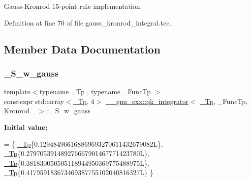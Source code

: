 Gauss-\/\+Kronrod 15-\/point rule implementation. 

Definition at line 70 of file gauss\+\_\+kronrod\+\_\+integral.\+tcc.



\subsection{Member Data Documentation}
\mbox{\label{struct____gnu__cxx_1_1qk__integrator_3_01__Tp_00_01__FuncTp_00_01Kronrod__15_01_4_aa127e01fbda9767c7602b5bf6db15bb4}} 
\subsubsection{\texorpdfstring{\+\_\+\+S\+\_\+w\+\_\+gauss}{\_S\_w\_gauss}}
{\footnotesize\ttfamily template$<$typename \+\_\+\+Tp , typename \+\_\+\+Func\+Tp $>$ \\
constexpr std\+::array$<$\hyperlink{namespace____gnu__cxx_a3b19a9c800ca194374ef9172290f7d79}{\+\_\+\+Tp}, 4$>$ \hyperlink{class____gnu__cxx_1_1qk__integrator}{\+\_\+\+\_\+gnu\+\_\+cxx\+::qk\+\_\+integrator}$<$ \hyperlink{namespace____gnu__cxx_a3b19a9c800ca194374ef9172290f7d79}{\+\_\+\+Tp}, \+\_\+\+Func\+Tp, Kronrod\+\_ $>$\+::\+\_\+\+S\+\_\+w\+\_\+gauss\hspace{0.3cm}{\ttfamily [static]}}

{\bfseries Initial value\+:}
\begin{DoxyCode}
=
      \{
        \hyperlink{namespace____gnu__cxx_a3b19a9c800ca194374ef9172290f7d79}{\_Tp}\{0.129484966168869693270611432679082L\},
        \hyperlink{namespace____gnu__cxx_a3b19a9c800ca194374ef9172290f7d79}{\_Tp}\{0.279705391489276667901467771423780L\},
        \hyperlink{namespace____gnu__cxx_a3b19a9c800ca194374ef9172290f7d79}{\_Tp}\{0.381830050505118944950369775488975L\},
        \hyperlink{namespace____gnu__cxx_a3b19a9c800ca194374ef9172290f7d79}{\_Tp}\{0.417959183673469387755102040816327L\}
      \}
\end{DoxyCode}


